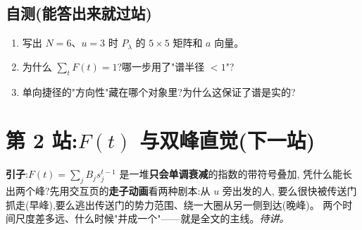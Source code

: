 \documentclass[11pt]{article}
\begin{document}
\subsection{自测(能答出来就过站)}
\begin{enumerate}
\item 写出 $N=6$、$u=3$ 时 $P_\lambda$ 的 $5\times5$ 矩阵和 $a$ 向量。
\item 为什么 $\sum_t F(t)=1$?哪一步用了"谱半径 $<1$"?
\item 单向捷径的"方向性"藏在哪个对象里?为什么这保证了谱是实的?
\end{enumerate}

\section{第 2 站:$F(t)$ 与双峰直觉(下一站)}\label{sec:s2}
\textbf{引子}:$F(t)=\sum_j B_j s_j^{t-1}$ 是一堆\textbf{只会单调衰减}的指数的带符号叠加,
凭什么能长出两个峰?先用交互页的\textbf{走子动画}看两种剧本:从 $u$ 旁出发的人,
要么很快被传送门抓走(早峰),要么逃出传送门的势力范围、绕一大圈从另一侧到达(晚峰)。
两个时间尺度差多远、什么时候"并成一个"——就是全文的主线。\emph{待讲。}
\end{document}
